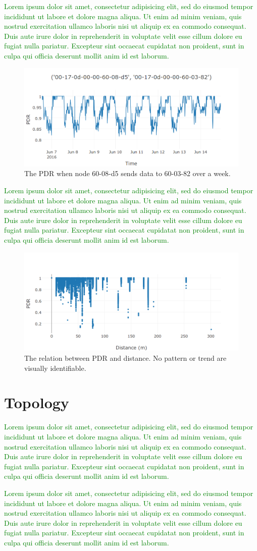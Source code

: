 \documentclass{sig-alternate}
\newcommand{\lorem}               {\textcolor{green}{Lorem ipsum dolor sit amet, consectetur adipisicing elit, sed do eiusmod tempor incididunt ut labore et dolore magna aliqua. Ut enim ad minim veniam, quis nostrud exercitation ullamco laboris nisi ut aliquip ex ea commodo consequat. Duis aute irure dolor in reprehenderit in voluptate velit esse cillum dolore eu fugiat nulla pariatur. Excepteur sint occaecat cupidatat non proident, sunt in culpa qui officia deserunt mollit anim id est laborum.}}
\begin{document}

\lorem

\begin{figure}
    \centering
    \includegraphics[width=\columnwidth]{periodic_pdr}
    \caption{The PDR when node 60-08-d5 sends data to 60-03-82 over a week.}
    \label{fig:periodic_pdr}
\end{figure}


\lorem

\begin{figure}
    \centering
    \includegraphics[width=\columnwidth]{pdr_dist}
    \caption{The relation between PDR and distance. No pattern or trend are visually identifiable.}
    \label{fig:pdr_dist}
\end{figure}

\section{Topology}
\label{sec:topology}


\lorem


\lorem
\end{document}
